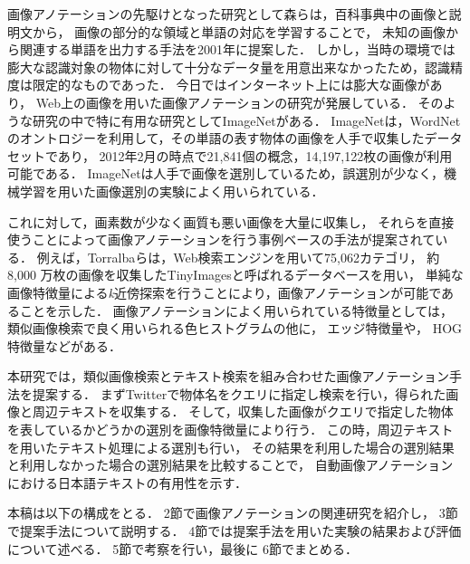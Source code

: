 \documentclass{deimj}
\begin{document}
画像アノテーションの先駆けとなった研究として森ら\cite{mori}は，百科事典中の画像と説明文から，
画像の部分的な領域と単語の対応を学習することで，
未知の画像から関連する単語を出力する手法を2001年に提案した．
しかし，当時の環境では膨大な認識対象の物体に対して十分なデータ量を用意出来なかったため，認識精度は限定的なものであった．
今日ではインターネット上には膨大な画像があり，
Web上の画像を用いた画像アノテーションの研究が発展している．
そのような研究の中で特に有用な研究としてImageNet\cite{imagenet}がある．
ImageNet\cite{imagenet}は，WordNetのオントロジーを利用して，その単語の表す物体の画像を人手で収集したデータセットであり，
2012年2月の時点で21,841個の概念，14,197,122枚の画像が利用可能である．
ImageNetは人手で画像を選別しているため，誤選別が少なく，機械学習を用いた画像選別の実験によく用いられている． 

これに対して，画素数が少なく画質も悪い画像を大量に収集し，
それらを直接使うことによって画像アノテーションを行う事例ベースの手法が提案されている．
例えば，Torralba\cite{torralba}らは，Web検索エンジンを用いて75,062カテゴリ，
約8,000 万枚の画像を収集したTinyImagesと呼ばれるデータベースを用い，
単純な画像特徴量による{\it k}近傍探索を行うことにより，画像アノテーションが可能であることを示した．
%
画像アノテーションによく用いられている特徴量としては，
類似画像検索で良く用いられる色ヒストグラムの他に，
エッジ特徴量や，
HOG特徴量\cite{dalal}などがある．

本研究では，類似画像検索とテキスト検索を組み合わせた画像アノテーション手法を提案する．
まずTwitterで物体名をクエリに指定し検索を行い，得られた画像と周辺テキストを収集する．
そして，収集した画像がクエリで指定した物体を表しているかどうかの選別を画像特徴量により行う．
この時，周辺テキストを用いたテキスト処理による選別も行い，
その結果を利用した場合の選別結果と利用しなかった場合の選別結果を比較することで，
自動画像アノテーションにおける日本語テキストの有用性を示す．

本稿は以下の構成をとる．
2節で画像アノテーションの関連研究を紹介し，
3節で提案手法について説明する．
4節では提案手法を用いた実験の結果および評価について述べる．
5節で考察を行い，最後に
6節でまとめる．
\end{document}
